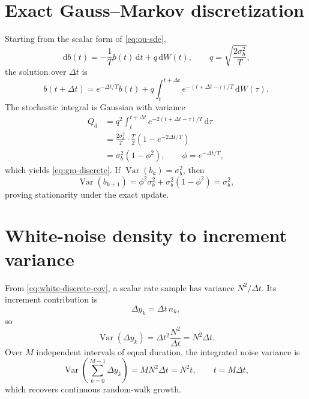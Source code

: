 \documentclass[11pt,oneside,headings=big]{scrreprt}
\newcommand{\Var}{\operatorname{Var}}
\newcommand{\dd}{\,\mathrm{d}}
\begin{document}
    \section{Exact Gauss--Markov discretization}
    Starting from the scalar form of \cref{eq:ou-sde},
    \begin{equation}
        \dd b(t)=-\frac{1}{T}b(t)\dd t+q\dd W(t),
        \qquad q=\sqrt{\frac{2\sigma_b^2}{T}},
    \end{equation}
    the solution over \(\Delta t\) is
    \begin{equation}
        b(t+\Delta t)
        =e^{-\Delta t/T}b(t)
        +q\int_t^{t+\Delta t}
        e^{-(t+\Delta t-\tau)/T}\dd W(\tau).
        \label{eq:ou-solution}
    \end{equation}
    The stochastic integral is Gaussian with variance
    \begin{align}
        Q_d
        &=q^2\int_t^{t+\Delta t}
        e^{-2(t+\Delta t-\tau)/T}\dd\tau\\
        &=\frac{2\sigma_b^2}{T}\cdot\frac{T}{2}
        \left(1-e^{-2\Delta t/T}\right)\\
        &=\sigma_b^2(1-\phi^2),
        \qquad \phi=e^{-\Delta t/T},
    \end{align}
    which yields \cref{eq:gm-discrete}. If
    \(\Var(b_k)=\sigma_b^2\), then
    \begin{equation}
        \Var(b_{k+1})
        =\phi^2\sigma_b^2+\sigma_b^2(1-\phi^2)
        =\sigma_b^2,
    \end{equation}
    proving stationarity under the exact update.


    \section{White-noise density to increment variance}
    From \cref{eq:white-discrete-cov}, a scalar rate sample has variance
    \(N^2/\Delta t\). Its increment contribution is
    \begin{equation}
        \Delta y_k=\Delta t\,n_k,
    \end{equation}
    so
    \begin{equation}
        \Var(\Delta y_k)
        =\Delta t^2\frac{N^2}{\Delta t}
        =N^2\Delta t.
    \end{equation}
    Over \(M\) independent intervals of equal duration, the integrated noise
    variance is
    \begin{equation}
        \Var\!\left(\sum_{k=0}^{M-1}\Delta y_k\right)
        =MN^2\Delta t=N^2t,
        \qquad t=M\Delta t,
    \end{equation}
    which recovers continuous random-walk growth.
\end{document}
